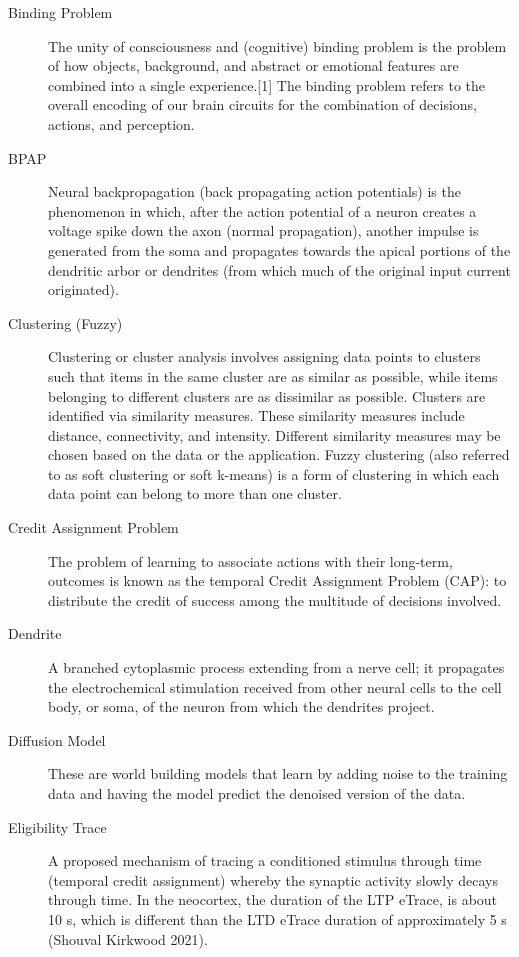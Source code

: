 \documentclass[11pt, a4paper]{article}
\begin{document}
\begin{description}
    \item[Binding Problem] The unity of consciousness and (cognitive) binding problem is the problem of how objects, background, and abstract or emotional features are combined into a single experience.[1] The binding problem refers to the overall encoding of our brain circuits for the combination of decisions, actions, and perception. 
 
    \item[BPAP] Neural backpropagation (back propagating action potentials) is the phenomenon in which, after the action potential of a neuron creates a voltage spike down the axon (normal propagation), another impulse is generated from the soma and propagates towards the apical portions of the dendritic arbor or dendrites (from which much of the original input current originated).

    \item[Clustering (Fuzzy)] Clustering or cluster analysis involves assigning data points to clusters such that items in the same cluster are as similar as possible, while items belonging to different clusters are as dissimilar as possible. Clusters are identified via similarity measures. These similarity measures include distance, connectivity, and intensity. Different similarity measures may be chosen based on the data or the application. Fuzzy clustering (also referred to as soft clustering or soft k-means) is a form of clustering in which each data point can belong to more than one cluster.

    \item[Credit Assignment Problem] The problem of learning to associate actions with their long-term, outcomes is known as the temporal Credit Assignment Problem (CAP): to distribute the credit of success among the multitude of decisions involved. 

    \item[Dendrite] A branched cytoplasmic process extending from a nerve cell; it propagates the electrochemical stimulation received from other neural cells to the cell body, or soma, of the neuron from which the dendrites project.

    \item[Diffusion Model] These are world building models that learn by adding noise to the training data and having the model predict the denoised version of the data.

    \item[Eligibility Trace] A proposed mechanism of tracing a conditioned stimulus through time (temporal credit assignment) whereby the synaptic activity slowly decays through time. In the neocortex, the duration of the LTP eTrace, is about 10 s, which is different than the LTD eTrace duration of approximately 5 s  (Shouval Kirkwood 2021).


\end{description}
\end{document}
